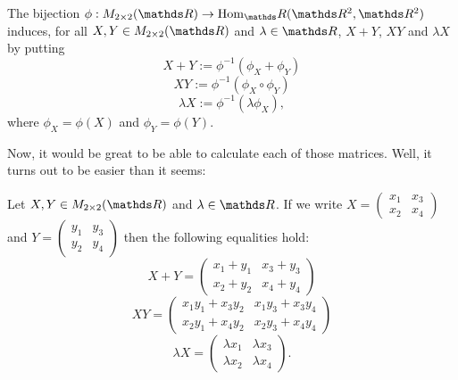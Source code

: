 \begin{df}
	The bijection $\phi:M_{2\times 2}(\R)\to\hom_\R(\R^2,\R^2)$ induces, for all $X,Y\in M_{2\times 2}(\R)$ and $\lambda\in \R$, $X+Y$, $XY$ and $\lambda X$ by putting $$X+Y:=\phi^{-1}(\phi_X+\phi_Y)$$ $$XY:=\phi^{-1}(\phi_X\circ \phi_Y)$$ $$\lambda X:=\phi^{-1}(\lambda \phi_X),$$ where $\phi_X=\phi(X)$ and $\phi_Y=\phi(Y)$.
\end{df}

Now, it would be great to be able to calculate each of those matrices. Well, it turns out to be easier than it seems:

\begin{prop}
	Let $X,Y\in M_{2\times 2}(\R)$ and $\lambda\in \R$. If we write $X=\begin{pmatrix}
	x_1&x_3\\x_2&x_4
	\end{pmatrix}$ and $Y=\begin{pmatrix}
	y_1&y_3\\y_2&y_4
	\end{pmatrix}$ then the following equalities hold:
	\[X+Y=\begin{pmatrix}
	x_1+y_1&x_3+y_3\\
	x_2+y_2&x_4+y_4
	\end{pmatrix}\]\[XY=\begin{pmatrix}
	x_1y_1+x_3y_2&x_1y_3+x_3y_4\\
	x_2y_1+x_4y_2&x_2y_3+x_4y_4
	\end{pmatrix}\]\[\lambda X=\begin{pmatrix}
	\lambda x_1&\lambda x_3\\
	\lambda x_2&\lambda x_4
	\end{pmatrix}.\]
\end{prop}
